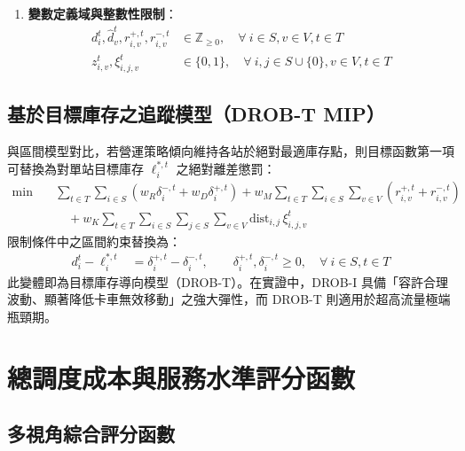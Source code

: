 \begin{enumerate}
    \begin{align}
    \sum_{j \in S \cup \{0\}} \xi^t_{i,j,v} &= z^t_{i,v}, \quad \forall\ i \in S, v \in V, t \in T \\
    \sum_{i \in S \cup \{0\}} \xi^t_{i,j,v} - \sum_{k \in S \cup \{0\}} \xi^t_{j,k,v} &= 0, \quad \forall\ j \in S, v \in V, t \in T
    \end{align}
    其中節點 $0$ 代表車輛基地或車隊出發原點。
    \item \textbf{變數定義域與整數性限制}：
    \begin{align}
    d^t_i, \hat{d}^t_v, r^{+, t}_{i,v}, r^{-, t}_{i,v} &\in \mathbb{Z}_{\ge 0}, \quad \forall\ i \in S, v \in V, t \in T \\
    z^t_{i,v}, \xi^t_{i,j,v} &\in \{0, 1\}, \quad \forall\ i, j \in S \cup \{0\}, v \in V, t \in T
    \end{align}
\end{enumerate}

\subsection{基於目標庫存之追蹤模型（DROB-T MIP）}\label{subsec:drob_t_tracking}

與區間模型對比，若營運策略傾向維持各站於絕對最適庫存點，則目標函數第一項可替換為對單站目標庫存 $\ell^{*, t}_i$ 之絕對離差懲罰：
\begin{align}
\min \quad & \sum_{t \in T} \sum_{i \in S} \left( w_R \delta^{-, t}_i + w_D \delta^{+, t}_i \right) + w_M \sum_{t \in T} \sum_{i \in S} \sum_{v \in V} \left( r^{+, t}_{i,v} + r^{-, t}_{i,v} \right) \\
&\quad + w_K \sum_{t \in T} \sum_{i \in S} \sum_{j \in S} \sum_{v \in V} \text{dist}_{i,j} \, \xi^t_{i,j,v}
\end{align}
限制條件中之區間約束替換為：
\begin{align}
d^t_i - \ell^{*, t}_i &= \delta^{+, t}_i - \delta^{-, t}_i, \qquad \delta^{+, t}_i, \delta^{-, t}_i \ge 0, \quad \forall\ i \in S, t \in T
\end{align}
此變體即為目標庫存導向模型（DROB-T）。在實證中，DROB-I 具備「容許合理波動、顯著降低卡車無效移動」之強大彈性，而 DROB-T 則適用於超高流量極端瓶頸期。

\section{總調度成本與服務水準評分函數}

\subsection{多視角綜合評分函數}


